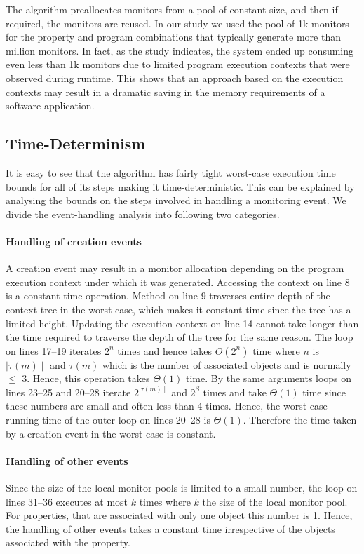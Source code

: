 The algorithm preallocates monitors from a pool of constant size, and then if 
required, the monitors are reused. In our study we used the pool of 1k monitors
for the property and program combinations that typically generate more than
million monitors. In fact, as the study indicates, the system ended up consuming
even less than 1k monitors due to limited program execution contexts that were
observed during runtime. This shows that an approach based on the execution
contexts may result in a dramatic saving in the memory requirements of a
software application.

\subsection{Time-Determinism}
\label{subsec:timedeterminism}

It is easy to see that the algorithm has fairly tight worst-case execution time bounds
for all of its steps making it time-deterministic. This can be explained
by analysing the bounds on the steps involved in handling a monitoring event.
We divide the event-handling analysis into following two categories.

\paragraph{Handling of creation events} A creation event may result in a monitor
allocation depending on the program execution context under which it was generated.
Accessing the context on line 8 is a constant time operation. Method  on
line 9 traverses entire depth of the context tree in the worst case, which makes it
constant time since the tree has a limited height. Updating the execution context on line 14
cannot take longer than the time required to traverse the depth of the tree for the same reason.
The loop on lines 17--19 iterates $2^n$ times and hence takes $O(2^n)$ time 
where $n$ is $\mid\tau(m)\mid$ and $\tau(m)$ which is the number of associated objects 
and is normally $\le$ 3. Hence, this operation takes $\Theta(1)$ time. By the same arguments
loops on lines 23--25 and 20--28 iterate $2^{\mid\tau(m)\mid}$ and $2^\beta$ times and take $\Theta(1)$
time since these numbers are small and often less than 4 times. Hence, the worst case running time
of the outer loop on lines 20--28 is $\Theta(1)$. Therefore the time taken by a creation event in the
worst case is constant.

\paragraph{Handling of other events}
Since the size of the local monitor pools is limited to a small number, the loop on lines 31--36
executes at most $k$ times where $k$ the size of the local monitor pool. For properties, that are
associated with only one object this number is 1. Hence, the handling of other events takes a
constant time irrespective of the objects associated with the property.

